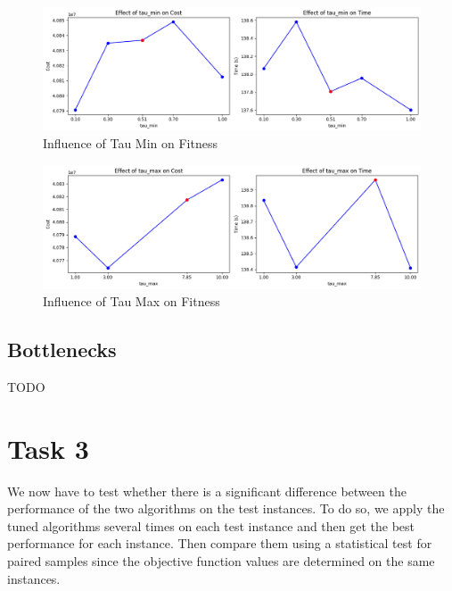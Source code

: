 \documentclass{article}
\begin{document}
\begin{figure}[H]
    \centering
    \includegraphics[width=\linewidth]{effect_of_tau_min.png}
    \caption{Influence of Tau Min on Fitness}
    \label{fig:tau_min}
\end{figure}

\begin{figure}[H]
    \centering
    \includegraphics[width=\linewidth]{effect_of_tau_max.png}
    \caption{Influence of Tau Max on Fitness}
    \label{fig:tau_max}
\end{figure}

\subsection{Bottlenecks}

TODO


\section{Task 3}

We now have to test whether there is a significant difference between the performance of the two algorithms on the test instances. To do so, we apply the tuned algorithms several times on each test instance and then get the best performance for each instance. Then compare them using a statistical test for paired samples since the objective function values are determined on the same instances. 
\end{document}
